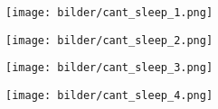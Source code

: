 \begin{figure*}[b]

    \begin{subfigure}{.23\textwidth}
        \texttt{[image: bilder/cant\_sleep\_1.png]}
    \end{subfigure}
    \hfill
    \begin{subfigure}{.23\textwidth}
        \texttt{[image: bilder/cant\_sleep\_2.png]}
    \end{subfigure}
    \hfill
    \begin{subfigure}{.23\textwidth}
        \texttt{[image: bilder/cant\_sleep\_3.png]}
    \end{subfigure}
    \hfill
    \begin{subfigure}{.23\textwidth}
        \texttt{[image: bilder/cant\_sleep\_4.png]}
    \end{subfigure}

\end{figure*}

